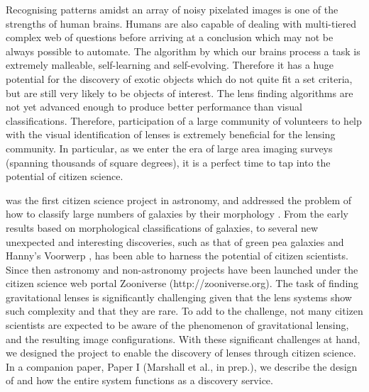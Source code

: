 \documentclass[useAMS,usenatbib,a4paper]{mn2e}
\begin{document}
Recognising patterns amidst an array of noisy pixelated images is one of the
strengths of human brains. Humans are also capable of dealing with
multi-tiered complex web of questions before arriving at a conclusion which may
not be always possible to automate. The algorithm by which our brains process a
task is extremely malleable, self-learning and self-evolving. Therefore it has
a huge potential for the discovery of exotic objects which do not quite fit a
set criteria, but are still very likely to be objects of interest. The lens
finding algorithms are not yet advanced enough to produce better performance
than visual classifications. Therefore, participation of a large community of
volunteers to help with the visual identification of lenses is extremely
beneficial for the lensing community. In particular, as we enter the era of
large area imaging surveys (spanning thousands of square degrees), it is
a perfect time to tap into the potential of citizen science.

\GZ was the first citizen science project in astronomy, and addressed
the problem of how to  classify large numbers of galaxies by their
morphology \citep{Lintott2008}.  From the early results based on
morphological classifications of galaxies, to several new unexpected and
interesting discoveries, such as that of green pea galaxies
\citep{Cardamone2009,Jaskot2013} and Hanny's Voorwerp
\citep{Lintott2009,Keel2012}, \GZ has been able to harness the potential
of citizen scientists.  Since then astronomy and non-astronomy projects
have been launched under the citizen science web portal Zooniverse
(http://zooniverse.org). The task of finding gravitational lenses is
significantly challenging given that the lens systems show such
complexity and that they are rare. To add to the challenge, not many
citizen scientists are expected to be aware of the phenomenon of
gravitational lensing, and the resulting image configurations.  With
these significant challenges at hand, we designed the \sw project to
enable the discovery of lenses through citizen science.  In a companion
paper, Paper I (Marshall et al., in prep.), we describe the design of
\sw and how the entire system functions as a discovery service.
\end{document}
